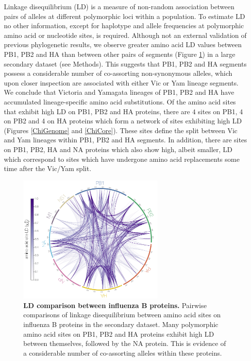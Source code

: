 \documentclass[11pt,oneside,letterpaper]{article}
\begin{document}
Linkage disequilibrium (LD) is a measure of non-random association between pairs of alleles at different polymorphic loci within a population.
To estimate LD no other information, except for haplotype and allele frequencies at polymorphic amino acid or nucleotide sites, is required.
Although not an external validation of previous phylogenetic results, we observe greater amino acid LD values between PB1, PB2 and HA than between other pairs of segments (Figure \ref{segmentLD}) in a large secondary dataset (see Methods).
This suggests that PB1, PB2 and HA segments possess a considerable number of co-assorting non-synonymous alleles, which upon closer inspection are associated with either Vic or Yam lineage segments.
We conclude that Victoria and Yamagata lineages of PB1, PB2 and HA have accumulated lineage-specific amino acid substitutions.
Of the amino acid sites that exhibit high LD on PB1, PB2 and HA proteins, there are 4 sites on PB1, 4 on PB2 and 4 on HA proteins which form a network of sites exhibiting high LD (Figures \ref{ChiGenome} and \ref{ChiCore}).
These sites define the split between Vic and Yam lineages within PB1, PB2 and HA segments.
In addition, there are sites on PB1, PB2, HA and NA proteins which also show high, albeit smaller, LD which correspond to sites which have undergone amino acid replacements some time after the Vic/Yam split.

\begin{figure}[h]
	\centering	
	\includegraphics[width=0.65\textwidth]{supp_figures/InfB_LDcircle.1600.aa.ChiSqdf.minorCutoff1percent.png}
	\caption{\textbf{LD comparison between influenza B proteins.}
Pairwise comparisons of linkage disequilibrium between amino acid sites on influenza B proteins in the secondary dataset.
Many polymorphic amino acid sites on PB1, PB2 and HA proteins exhibit high LD between themselves, followed by the NA protein.
This is evidence of a considerable number of co-assorting alleles within these proteins.}
	\label{segmentLD}
\end{figure}
\end{document}
